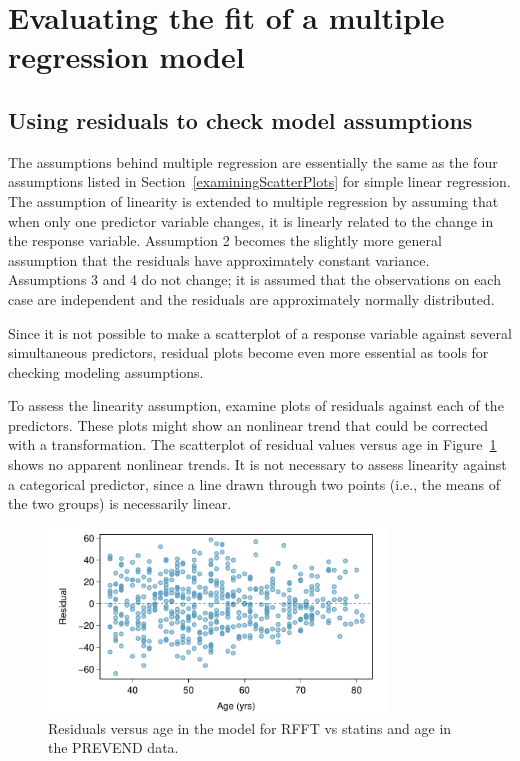 

\section{Evaluating the fit of a multiple regression model}
\label{evaluatingFitMultipleRegression}

\subsection{Using residuals to check model assumptions}
\label{modelCheckMultipleRegression}


The assumptions behind multiple regression are essentially the same as the four assumptions listed in Section~\ref{examiningScatterPlots} for simple linear regression. The assumption of linearity is extended to multiple regression by assuming that when only one predictor variable changes, it is linearly related to the change in the response variable.  Assumption 2 becomes the slightly more general assumption that the residuals have approximately constant variance. Assumptions 3 and 4 do not change; it is assumed that the observations on each case are independent and the residuals are approximately normally distributed.

Since it is not possible to make a scatterplot of a response variable against several simultaneous predictors, residual plots become even more essential as tools for checking modeling assumptions. 

To assess the linearity assumption, examine plots of residuals against each of the predictors. These plots might show an nonlinear trend that could be corrected with a transformation. The scatterplot of residual values versus age in Figure~\ref{prevendStatinAgeResidPlot} shows no apparent nonlinear trends. It is not necessary to assess linearity against a categorical predictor, since a line drawn through two points (i.e., the means of the two groups) is necessarily linear.

\begin{figure}[h]
	\centering
	\includegraphics[width=0.8\textwidth]
	{ch_multiple_linear_regression_oi_biostat/figures/prevendStatinAgeResidPlot/prevendStatinAgeResidPlot.pdf}
	\caption{Residuals versus age in the model for RFFT vs statins and age in the PREVEND data.}
	\label{prevendStatinAgeResidPlot}
\end{figure}

